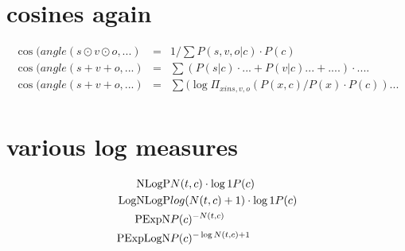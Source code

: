 \section{cosines again}

\begin{eqnarray}
\cos(angle(s\odot v\odot o, ...) &=&  1/ \sum P(s,v,o|c) \cdot P(c)\\
\cos(angle(s+v+o, ...) &=& \sum (P(s|c)  \cdot  ... + P(v|c) ... + ....)  \cdot  ....\\
\cos(angle(s+v+o, ...) &=&  \sum (\log{\Pi_{x in s,v,o} (P(x,c)/P(x) \cdot P(c)) ...}\\
\end{eqnarray}

\section{various log measures}

\begin{eqnarray}
\textmd{NLogP}&   N(t,c)  \cdot \log{1}{P(c)}\\
\textmd{LogNLogP}&  log(N(t,c)+1) \cdot \log{1}{P(c)}\\
\textmd{PExpN}&    P(c)^{-N(t,c)}\\
\textmd{PExpLogN}& P(c)^{-\log{N(t,c)+1}}\\
\end{eqnarray}

